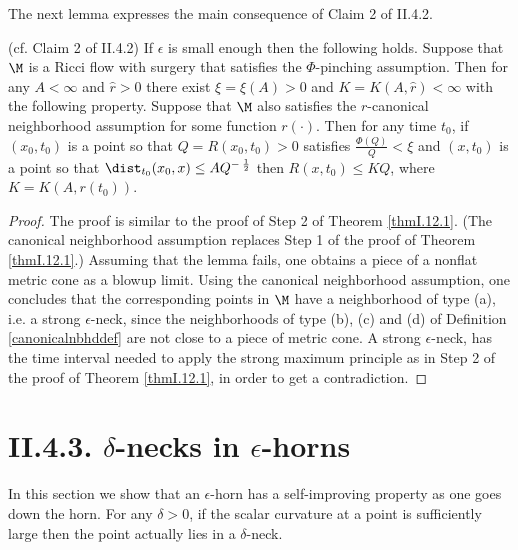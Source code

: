 The next lemma expresses the main consequence of
Claim 2 of II.4.2.

\begin{lemma}
  \label{lem:kl-curvature-bounds-from-priori-assumptions-canonical-neighborhoods-lemma}
(cf. Claim 2 of II.4.2)
\label{claim2II.4.2}
If $\epsilon$ is small enough then the following holds.
Suppose that $\M$ is a Ricci flow with surgery that satisfies the
$\Phi$-pinching assumption.
Then for any $A<\infty$ and $\widehat{r} > 0$ there exist
$\xi=\xi(A) > 0$ and $K=K(A,\widehat{r}) < \infty$
with the following property.
Suppose that $\M$ also satisfies the $r$-canonical neighborhood assumption
for some function $r(\cdot)$.
Then for any time $t_0$, if
$(x_0,t_0)$ is a point so that $Q = R(x_0,t_0) > 0$ satisfies
$\frac{\Phi(Q)}{Q} < \xi$
and $(x, t_0)$ is a point so that
$\dist_{t_0}(x_0, x) \le A Q^{- \: \frac12}$ then $R(x, t_0) \le KQ$,
where $K = K(A, r(t_0))$.
\end{lemma}
\begin{proof}
The proof is similar to the  proof of Step 2 of Theorem
\ref{thmI.12.1}.
(The canonical neighborhood assumption
replaces Step 1 of the proof of Theorem \ref{thmI.12.1}.)
Assuming that the lemma fails, one obtains a
piece of a nonflat metric cone as a blowup limit.
Using the canonical neighborhood assumption, one concludes
that the corresponding points in $\M$
have a neighborhood of type (a), i.e. a strong
$\epsilon$-neck, since
the neighborhoods of type (b), (c) and (d) of Definition
\ref{canonicalnbhddef} are not close to a piece of metric
cone. A strong $\epsilon$-neck, has the time interval needed to apply
the strong maximum
principle as in Step 2 of the proof of Theorem \ref{thmI.12.1}, in
order to get a contradiction.
\end{proof}

\section{II.4.3. $\delta$-necks in $\epsilon$-horns}

In this section we show that an $\epsilon$-horn has a
self-improving property as one goes down the horn.
For any $\delta > 0$, if the scalar curvature at a point
is sufficiently large then the point actually lies in a
$\delta$-neck.


